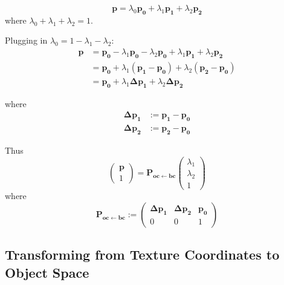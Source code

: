 \documentclass{article}
\newcommand{\point}[1]{\mathbf{#1}}
\newcommand{\mat}[1]{\mathbf{#1}}
\newcommand{\pMat}[2]{\mat{P_{#1 \leftarrow #2}}}
\newcommand{\colvec}[1]{\begin{pmatrix}#1\end{pmatrix}}
\begin{document}
\[
\point{p} = \lambda_0 \point{p_0} + \lambda_1 \point{p_1} + \lambda_2 \point{p_2}
\]
where \(\lambda_0 + \lambda_1 + \lambda_2 = 1\).

Plugging in \(\lambda_0 = 1 - \lambda_1 - \lambda_2\):
\begin{align*}
\point{p} &= \point{p_0} - \lambda_1 \point{p_0} - \lambda_2 \point{p_0}  + \lambda_1 \point{p_1} + \lambda_2 \point{p_2} \\
&= \point{p_0}  + \lambda_1 (\point{p_1}-\point{p_0}) + \lambda_2 (\point{p_2} - \point{p_0})\\
&= \point{p_0} + \lambda_1 \point{\Delta p_1} + \lambda_2 \point{\Delta p_2}
\end{align*}

where
\begin{align*}
\point{\Delta p_1} &:= \point{p_1} - \point{p_0}\\
\point{\Delta p_2} &:= \point{p_2} - \point{p_0}
\end{align*}

Thus
\[
 \colvec{\point{p}\\1} = \pMat{oc}{bc} \colvec{\lambda_1 \\ \lambda_2 \\ 1}
\]
where
\begin{equation}
\label{eq:mat_oc_from_bc}
 \pMat{oc}{bc} := \begin{pmatrix} 
                  \point{\Delta p_1} & \point{\Delta p_2} & \point{p_0} \\
                  0 & 0 & 1
                 \end{pmatrix}
\end{equation}


\subsection{Transforming from Texture Coordinates to Object Space}
\end{document}
